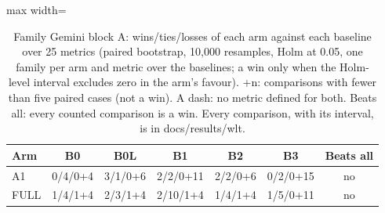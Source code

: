 \begin{table}[!t]
\centering\small
\begin{adjustbox}{max width=\textwidth}
\begin{tabular}{@{}lcccccc@{}}
\toprule
Arm & B0 & B0L & B1 & B2 & B3 & Beats all \\
\midrule
A1 & 0/4/0+4 & 3/1/0+6 & 2/2/0+11 & 2/2/0+6 & 0/2/0+15 & no \\
FULL & 1/4/1+4 & 2/3/1+4 & 2/10/1+4 & 1/4/1+4 & 1/5/0+11 & no \\
\bottomrule
\end{tabular}
\end{adjustbox}
\caption{Family Gemini block A: wins/ties/losses of each arm against each baseline over 25 metrics (paired bootstrap, 10,000 resamples, Holm at 0.05, one family per arm and metric over the baselines; a win only when the Holm-level interval excludes zero in the arm's favour). +n: comparisons with fewer than five paired cases (not a win). A dash: no metric defined for both. Beats all: every counted comparison is a win. Every comparison, with its interval, is in docs/results/wlt.}
\label{tab:wlt_gemini}
\end{table}
